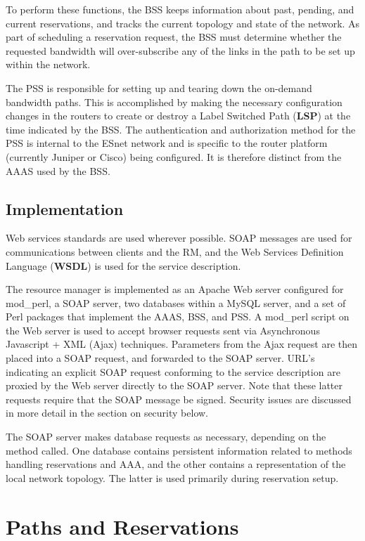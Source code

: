 \documentclass[conference]{IEEEtran}
\begin{document}
To perform these functions, the BSS keeps information about past,
pending, and current reservations, and tracks the current topology and state of
the network.  As part of scheduling a reservation request, the BSS must
determine whether the requested bandwidth will over-subscribe any of the links
in the path to be set up within the network.

The PSS is responsible for setting up and tearing down the on-demand bandwidth 
paths. This is accomplished by making the necessary configuration changes in 
the routers to create or destroy a Label Switched Path (\textbf{LSP}) at the
time
indicated by the BSS. The authentication and authorization method for the PSS 
is internal to the ESnet network and is specific to the router platform 
(currently Juniper or Cisco) being configured.  It is therefore distinct from 
the AAAS used by the BSS.

\subsection{Implementation}

Web services standards are used wherever possible.  SOAP messages are
used for communications between clients and the RM, and 
the Web Services Definition Language (\textbf{WSDL}) is used for the service description.
 
The resource manager is implemented as an Apache Web server configured for
mod\_perl, a SOAP server, two databases within a MySQL server, and a set of 
Perl packages that implement the AAAS, BSS, and PSS.  A mod\_perl script on
the Web server is used to accept browser requests sent via Asynchronous
Javascript + XML (Ajax) techniques.
Parameters from the Ajax request are then placed into a SOAP request, and
forwarded to the SOAP server.
URL's indicating an explicit SOAP request conforming to the service 
description are proxied by the Web server directly to the SOAP server.
Note that these latter requests require that the SOAP message be signed.
Security issues are discussed in more detail in the section on security below.

The SOAP server makes database requests as necessary, depending on the
method called.  One database 
contains persistent information related to methods handling 
reservations and AAA, and the other contains a representation of the local
network topology.  The latter is used primarily during reservation setup.

\section{Paths and Reservations}
\end{document}
